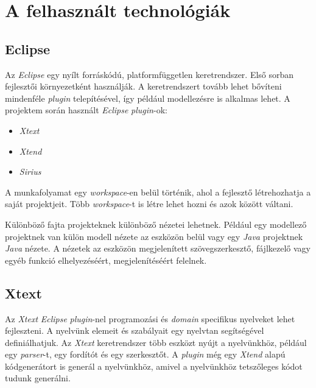 \section{A felhasznált technológiák}
\subsection{Eclipse}

Az \textit{Eclipse} \cite{Eclipse} egy nyílt forráskódú, platformfüggetlen keretrendszer.
Első sorban fejlesztői környezetként használják.
A keretrendszert tovább lehet bővíteni mindenféle \textit{plugin} telepítésével, így például modellezésre is alkalmas lehet.
A projektem során használt \textit{Eclipse} \textit{plugin}-ok:

\begin{itemize}
    \item \textit{Xtext} \cite{Xtext}
    \item \textit{Xtend} \cite{Xtend}
    \item \textit{Sirius} \cite{Sirius}
\end{itemize}

A munkafolyamat egy \textit{workspace}-en belül történik, ahol a fejlesztő létrehozhatja a saját projektjeit.
Több \textit{workspace}-t is létre lehet hozni és azok között váltani.

Különböző fajta projekteknek különböző nézetei lehetnek.
Például egy modellező projektnek van külön modell nézete az eszközön belül vagy egy \textit{Java} projektnek \textit{Java} nézete.
A nézetek az eszközön megjelenített szövegszerkesztő, fájlkezelő vagy egyéb funkció elhelyezéséért, megjelenítéséért felelnek.

\subsection{Xtext}

Az \textit{Xtext} \cite{Xtext} \textit{Eclipse} \textit{plugin}-nel programozási és \textit{domain} specifikus nyelveket lehet fejleszteni.
A nyelvünk elemeit és szabályait egy nyelvtan segítségével definiálhatjuk.
Az \textit{Xtext} keretrendszer több eszközt nyújt a nyelvünkhöz, például egy \textit{parser}-t, egy fordítót és egy szerkesztőt.
A \textit{plugin} még egy \textit{Xtend} alapú kódgenerátort is generál a nyelvünkhöz, amivel a nyelvünkhöz tetszőleges kódot tudunk generálni.

